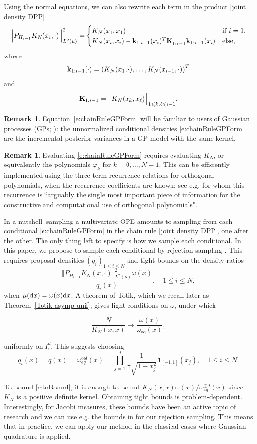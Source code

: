 \documentclass[a4paper,11pt]{article}
\numberwithin{equation}{section}
\theoremstyle{definition}
\newtheorem{Remark}[]{Remark}
\newenvironment{remark}{\begin{Remark}\rm}{\end{Remark}}
\newcommand{\rev}[1]{#1}
\newcommand{\eq}{\begin{equation}}
\newcommand{\qe}{\end{equation}}
\newcommand{\bs}{\boldsymbol}
\renewcommand{\leq}{\leqslant}
\renewcommand{\phi}{\varphi}
\renewcommand{\epsilon}{\varepsilon}
\renewcommand{\d}{ {\rm d}}
\def\IND{{\bs 1}}
\begin{document}
Using the normal equations, we can also rewrite
each term in the product \eqref{joint density DPP}
\eq
\Big\Vert P_{H_{i-1}} K_N(x_i,\cdot)\Big\Vert_{L^2(\mu)}^2 =
\begin{cases}
K_N(x_1,x_1) & \text{if } i=1,\\
 K_N(x_i,x_i) - {\bf k}_{1:i-1}(x_i)^T {\bf K}_{1:i-1}^{-1} {\bf k}_{1:i-1}(x_i) & \text{else,}
\end{cases}
\label{e:chainRuleGPForm}
\qe
where
$$ {\bf k}_{1:i-1}(\cdot) = \left( K_N(x_1,\cdot),\dots,K_N(x_{i-1},\cdot) \right)^T $$
and
$$ {\bf K}_{1:i-1} = \Big[K_N(x_k,x_\ell)\Big]_{1\leq k,\ell \leq i-1}.$$
\begin{remark}
Equation~\eqref{e:chainRuleGPForm} will be familiar to users of Gaussian
processes (GPs; \citealt{RaWi06}): the unnormalized conditional densities
\eqref{e:chainRuleGPForm} are the incremental posterior variances in a GP model
with the same kernel.
\end{remark}
\rev{
\begin{remark}
Evaluating \eqref{e:chainRuleGPForm} requires evaluating $K_N$, or equivalently the polynomials $\phi_k$ for $k=0,\dots,N-1$. This can be efficiently implemented using the three-term recurrence relations for orthogonal polynomials, when the recurrence coefficients are known; see e.g. \citep[Section 1.3]{Gau04} for whom this recurrence is ``arguably the single most important piece of information for the constructive and computational use of orthogonal polynomials".
\end{remark}
}
\rev{In a nutshell, sampling a multivariate OPE amounts to sampling from each conditional \eqref{e:chainRuleGPForm} in the chain rule \eqref{joint density DPP}, one after the other. The only thing left to specify is how we sample each conditional. In this paper, we propose to sample each conditional by rejection sampling \citep[Section 2.3]{RoCa04}.} This requires proposal densities $(q_i)_{1\leq
  i\leq N}$ and tight bounds on the density ratios
\eq
\label{e:toBound}
\frac{\Big\Vert P_{H_{i-1}} K_N(x,\cdot)\Big\Vert_{L^2(\mu)}^2 \omega(x)}
{q_i(x)}, \quad 1\leq i \leq N,
\qe
when $\mu(\d x)=\omega(x)\d x$. \rev{A theorem of Totik, which we recall later as Theorem~\ref{Totik asymp unif}, gives light conditions on $\omega$, under which}
\rev{
$$
\frac{N}{K_N(x,x)}\rightarrow \frac{\omega(x)}{\omega_{\text{eq}}(x)},
$$
}
\rev{
uniformly on $I_\epsilon^d$. This suggests choosing
$$q_i(x) = q(x) = \omega_{eq}^{\otimes d}(x) = \prod_{j=1}^d \frac{1}{\pi\sqrt{1-x_j^2}}\IND_{[-1,1]}(x_j), \quad
1\leq i\leq N.$$
}
To bound \eqref{e:toBound}, it is enough to bound
$K_N(x,x)\omega(x)/\omega_{eq}^{\otimes d}(x)$ since $K_N$ is a positive definite
kernel. Obtaining tight bounds is
problem-dependent. Interestingly, for Jacobi measures, these bounds have been an active
topic of research and we can use e.g. the bounds in \citep{Gau09} for our
rejection sampling. This means that in practice, we can apply our method in the
classical cases where Gaussian quadrature is applied.
\end{document}
